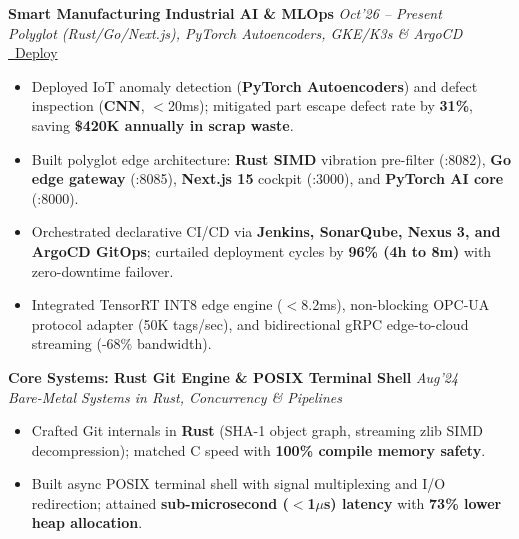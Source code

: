 \documentclass[10pt,a4paper]{article}
\begin{document}
\begin{minipage}[t]{0.488\textwidth}
    \vspace{0.8pt}\vspace{1.2pt}
    \noindent\textbf{Smart Manufacturing Industrial AI \& MLOps} \hfill {\footnotesize\textit{Oct'26 -- Present}}\\
    \textit{Polyglot (Rust/Go/Next.js), PyTorch Autoencoders, GKE/K3s \& ArgoCD} \href{https://github.com/KishorKumarParoi/smart-manufacturing}{\faGithub} \href{https://raw.githubusercontent.com/KishorKumarParoi/smart-manufacturing/main/bootstrap.sh}{\faRocket\ Deploy}
    \begin{itemize}
        \item Deployed IoT anomaly detection (\textbf{PyTorch Autoencoders}) and defect inspection (\textbf{CNN}, $<$20ms); mitigated part escape defect rate by \textbf{31\%}, saving \textbf{\$420K annually in scrap waste}.
        \item Built polyglot edge architecture: \textbf{Rust SIMD} vibration pre-filter (:8082), \textbf{Go edge gateway} (:8085), \textbf{Next.js 15} cockpit (:3000), and \textbf{PyTorch AI core} (:8000).
        \item Orchestrated declarative CI/CD via \textbf{Jenkins, SonarQube, Nexus 3, and ArgoCD GitOps}; curtailed deployment cycles by \textbf{96\% (4h to 8m)} with zero-downtime failover.
        \item Integrated TensorRT INT8 edge engine ($<$8.2ms), non-blocking OPC-UA protocol adapter (50K tags/sec), and bidirectional gRPC edge-to-cloud streaming (-68\% bandwidth).
    \end{itemize}

    \vspace{0.8pt}\vspace{1.2pt}
    \noindent\textbf{Core Systems: Rust Git Engine \& POSIX Terminal Shell} \hfill {\footnotesize\textit{Aug'24}}\\
    \textit{Bare-Metal Systems in Rust, Concurrency \& Pipelines} \href{https://github.com/KishorKumarParoi/codecrafters-git-rust}{\faGithub}
    \begin{itemize}
        \item Crafted Git internals in \textbf{Rust} (SHA-1 object graph, streaming zlib SIMD decompression); matched C speed with \textbf{100\% compile memory safety}.
        \item Built async POSIX terminal shell with signal multiplexing and I/O redirection; attained \textbf{sub-microsecond ($<$1$\mu$s) latency} with \textbf{73\% lower heap allocation}.
    \end{itemize}


\end{minipage}
\end{document}
